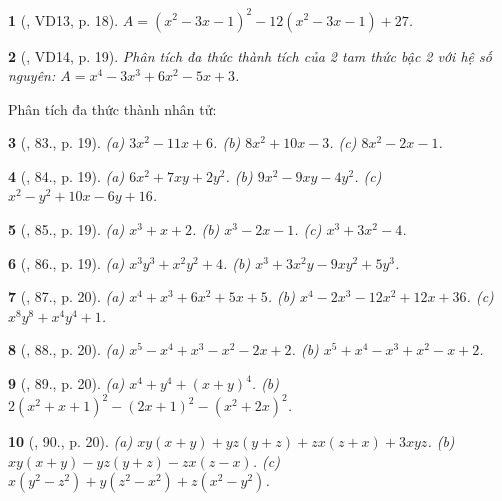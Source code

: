 \documentclass{article}
\newtheorem{baitoan}{}
\begin{document}
\begin{baitoan}[\cite{Tuyen_Toan_8}, VD13, p. 18]
	$A = (x^2 - 3x - 1)^2 - 12(x^2 - 3x - 1) + 27$.
\end{baitoan}

\begin{baitoan}[\cite{Tuyen_Toan_8}, VD14, p. 19]
	Phân tích đa thức thành tích của 2 tam thức bậc 2 với hệ số nguyên: $A = x^4 - 3x^3 + 6x^2 - 5x + 3$.
\end{baitoan}
Phân tích đa thức thành nhân tử:

\begin{baitoan}[\cite{Tuyen_Toan_8}, 83., p. 19]
	(a) $3x^2 - 11x + 6$. (b) $8x^2 + 10x - 3$. (c) $8x^2 - 2x - 1$.
\end{baitoan}

\begin{baitoan}[\cite{Tuyen_Toan_8}, 84., p. 19]
	(a) $6x^2 + 7xy + 2y^2$. (b) $9x^2 - 9xy - 4y^2$. (c) $x^2 - y^2 + 10x - 6y + 16$.
\end{baitoan}

\begin{baitoan}[\cite{Tuyen_Toan_8}, 85., p. 19]
	(a) $x^3 + x + 2$. (b) $x^3 - 2x - 1$. (c) $x^3 + 3x^2 - 4$.
\end{baitoan}

\begin{baitoan}[\cite{Tuyen_Toan_8}, 86., p. 19]
	(a) $x^3y^3 + x^2y^2 + 4$. (b) $x^3 + 3x^2y - 9xy^2 + 5y^3$.
\end{baitoan}

\begin{baitoan}[\cite{Tuyen_Toan_8}, 87., p. 20]
	(a) $x^4 + x^3 + 6x^2 + 5x + 5$. (b) $x^4 - 2x^3 - 12x^2 + 12x + 36$. (c) $x^8y^8 + x^4y^4 + 1$.
\end{baitoan}

\begin{baitoan}[\cite{Tuyen_Toan_8}, 88., p. 20]
	(a) $x^5 - x^4 + x^3 - x^2 - 2x + 2$. (b) $x^5 + x^4 - x^3 + x^2 - x + 2$.
\end{baitoan}

\begin{baitoan}[\cite{Tuyen_Toan_8}, 89., p. 20]
	(a) $x^4 + y^4 + (x + y)^4$. (b) $2(x^2 + x + 1)^2 - (2x + 1)^2 - (x^2 + 2x)^2$.
\end{baitoan}

\begin{baitoan}[\cite{Tuyen_Toan_8}, 90., p. 20]
	(a) $xy(x + y) + yz(y + z) + zx(z + x) + 3xyz$. (b) $xy(x + y) - yz(y + z) - zx(z - x)$. (c) $x(y^2 - z^2) + y(z^2 - x^2) + z(x^2 - y^2)$.
\end{baitoan}
\end{document}
